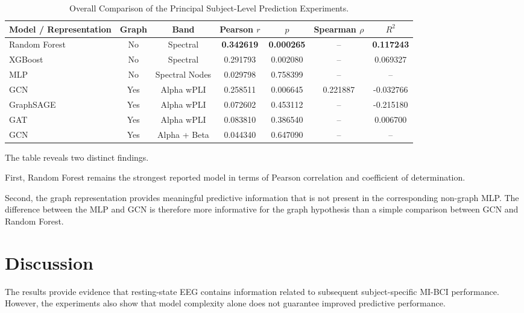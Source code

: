 \documentclass[conference]{IEEEtran}
\begin{document}
\begin{table}[h]
\caption{Overall Comparison of the Principal Subject-Level Prediction Experiments.}
\label{tab:overall}
\centering
\begin{tabular}{lcccccc}
\toprule
Model / Representation & Graph & Band & Pearson $r$ & $p$ & Spearman $\rho$ & $R^2$ \\
\midrule
Random Forest & No  & Spectral       & \textbf{0.342619} & \textbf{0.000265} & --                & \textbf{0.117243} \\
XGBoost       & No  & Spectral       & 0.291793          & 0.002080          & --                & 0.069327          \\
MLP           & No  & Spectral Nodes & 0.029798          & 0.758399          & --                & --                \\
GCN           & Yes & Alpha wPLI     & 0.258511          & 0.006645          & 0.221887          & -0.032766         \\
GraphSAGE     & Yes & Alpha wPLI     & 0.072602          & 0.453112          & --                & -0.215180         \\
GAT           & Yes & Alpha wPLI     & 0.083810          & 0.386540          & --                & 0.006700          \\
GCN           & Yes & Alpha + Beta   & 0.044340          & 0.647090          & --                & --                \\
\bottomrule
\end{tabular}
\end{table}

The table reveals two distinct findings.

First, Random Forest remains the strongest reported model in terms of Pearson correlation and coefficient of determination.

Second, the graph representation provides meaningful predictive information that is not present in the corresponding non-graph MLP. The difference between the MLP and GCN is therefore more informative for the graph hypothesis than a simple comparison between GCN and Random Forest.

\section{Discussion}
The results provide evidence that resting-state EEG contains information related to subsequent subject-specific MI-BCI performance. However, the experiments also show that model complexity alone does not guarantee improved predictive performance.
\end{document}
